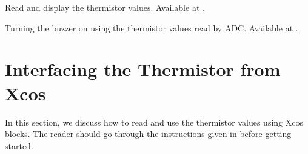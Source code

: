 \begin{scicode}
   {Read and display
    the thermistor values.  Available at
    .}
  \label{sci:therm-read}
  
\end{scicode}

\begin{scicode}
  {Turning the buzzer on using the thermistor values read by
    ADC.  Available at .}
  \label{sci:therm-buzzer}
  
\end{scicode}

\section{Interfacing the Thermistor from Xcos}
In this section, we discuss how to read and use the thermistor values using
Xcos blocks. The reader should go
through the instructions given in  before
getting started.

